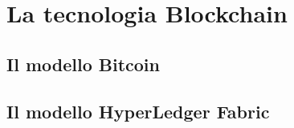 \section{La tecnologia Blockchain}

\subsection{Il modello Bitcoin}

\subsection{Il modello HyperLedger Fabric}